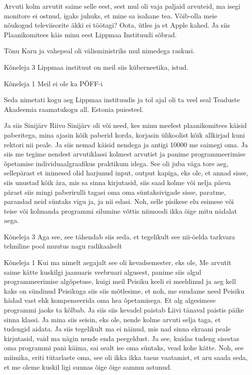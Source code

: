Arvuti kolm arvutit saime selle eest, sest mul oli vaja paljaid arvuteid, ma isegi monitore ei ostnud, igaks juhuks, et mine sa isahane tea. Võib-olla meie nõukogud televiisorite äkki ei töötagi? Oota, ütles ja et Apple kahed. Ja siis Plaanikomitees käis minu eest Lippmaa Instituudi sõbrad. 

Tõnu Karu ja vahepeal oli välisministriks mul nimedega raskusi. 

Kõneleja 3
Lippmaa instituut on meil siis küberneetika, istud. 

Kõneleja 1
Meil ei ole ka PÖFF-i 

Seda nimetati kogu aeg Lippmaa instituudis ja tol ajal oli ta veel seal Teaduste Akadeemia raamatukogu all. Estonia puiesteel. 

Ja siis Sinijärv Riivo Sinijärv oli või need, kes minu meelest plaanikomitees käisid paberitega, mina ajasin kõik paberid korda, korjasin ülikoolist kõik allkirjad kuni rektori nii peale. Ja siis nemad käisid nendega ja antigi 10000 me saimegi oma. Ja siis me tegime nendest arvutiklassi kolmest arvutist ja panime programmeerimise õpetamise individuaalgraafikus praktikum idega. See oli juba väga tore aeg, sellepärast et inimesed olid harjunud input, output kapiga, eks ole, et annad sisse, siis unustad kõik ära, mis sa sinna kirjutasid, siis saad kolme või nelja päeva pärast siis mingi paberirulli tagasi oma oma süntaksivigade sisse, paratme, parandad neid süntaks vigu ja, ja nii edasi. Noh, selle pisikese elu esimese või teise või kolmanda programmi silumine võttis niimoodi ikka õige mitu nädalat aega. 

Kõneleja 3
Aga see, see tähendab siis seda, et tegelikult see nii-öelda tarkvara tehniline pool muutus nagu radikaalselt 

Kõneleja 1
Kui ma nimelt aegajalt see oli kevadsemester, eks ole, Me arvutit saime kätte kuskilgi jaanuaris veebruari algusest, panime siis algul programmeerimise algõpetuse, kuigi meil Peisiku keeli ei meeldinud ja aeg kell kaks on sündinud Peisikuga siis siis mõtlesime, et noh, me suudame need Peisiku hädad vast ehk kompenseerida oma hea õpetamisega. Et alg algesimese programmi jaoks ta kõlbab. Ja siis siis kevadel paistab Liivi tänaval paistis päike sinna klassi. Ja mina siis seisin, eks ole, nende kolme arvuti selja taga, et tudengid aidata. Ja siis tegelikult ma ei näinud, mis nad sinna ekraani peale kirjutasid, vaid ma nägin nende enda peegeldust. Ja see, kuidas tudeng sisestas oma programmi pani käima, sai sealt ise oma süntaks, vead kohe kätte. Noh, see miimika, eriti tütarlaste oma, see oli ikka ikka tasus vaatamist, et aru saada seda, et me oleme kuskil ligi suunas õige õige sammu astunud. 

